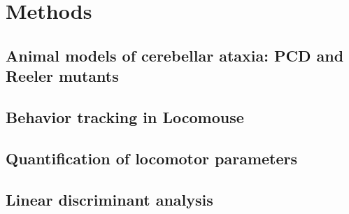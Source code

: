 \section{Methods}
\subsection{Animal models of cerebellar ataxia: PCD and Reeler mutants} %
\subsection{Behavior tracking in Locomouse}
\subsection{Quantification of locomotor parameters} %
\subsection{Linear discriminant analysis} %


